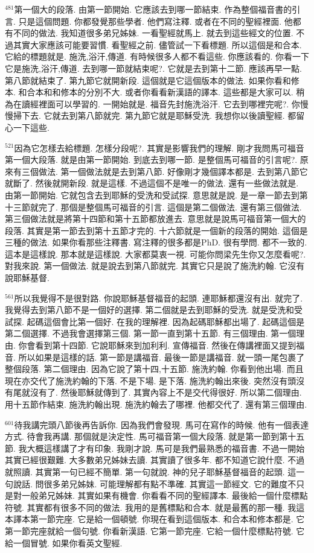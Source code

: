 \documentclass{book}
\begin{document}
$^{481}$第一個大的段落.
由第一節開始.
它應該去到哪一節結束.
作為整個福音書的引言.
只是這個問題.
你都發覺那些學者.
他們寫注釋.
或者在不同的聖經裡面.
他都有不同的做法.
我知道很多弟兄姊妹.
一看聖經就馬上.
就去到這些經文的位置.
不過其實大家應該可能要習慣.
看聖經之前.
儘管試一下看標題.
所以這個是和合本.
它給的標題就是.
施洗,浴汗,傳道.
有時候很多人都不看這些.
你應該看的.
你看一下它是施洗,浴汗,傳道.
去到哪一節就結束呢?.
它就是去到第十二節.
應該再早一點.
第八節就結束了.
第九節它就開新段.
這個就是它這個版本的做法.
如果你看和修本.
和合本和和修本的分別不大.
或者你看看新漢語的譯本.
這些都是大家可以.
稍為在讀經裡面可以學習的.
一開始就是.
福音先封施洗浴汗.
它去到哪裡完呢?.
你慢慢掃下去.
它就去到第八節就完.
第九節它就是耶穌受洗.
我想你以後讀聖經.
都留心一下這些.

$^{521}$因為它怎樣去給標題.
怎樣分段呢?.
其實是影響我們的理解.
剛才我問馬可福音第一個大段落.
就是由第一節開始.
到底去到哪一節.
是整個馬可福音的引言呢?.
原來有三個做法.
第一個做法就是去到第八節.
好像剛才幾個譯本都是.
去到第八節它就斷了.
然後就開新段.
就是這樣.
不過這個不是唯一的做法.
還有一些做法就是.
由第一節開始.
它就包含去到耶穌的受洗和受試探.
意思就是說.
是一章一節去到第十三節就完了.
那個是整個馬可福音的引言.
這個是第二個做法.
還有第三個做法.
第三個做法就是將第十四節和第十五節都放進去.
意思就是說馬可福音第一個大的段落.
其實是第一節去到第十五節才完的.
十六節就是一個新的段落的開始.
這個是三種的做法.
如果你看那些注釋書.
寫注釋的很多都是PhD.
很有學問.
都不一致的.
這本是這樣說.
那本就是這樣說.
大家都莫衷一視.
可能你問梁先生你又怎麼看呢?.
對我來說.
第一個做法.
就是說去到第八節就完.
其實它只是說了施洗約翰.
它沒有說耶穌基督.

$^{561}$所以我覺得不是很對路.
你說耶穌基督福音的起頭.
連耶穌都還沒有出.
就完了.
我覺得去到第八節不是一個好的選擇.
第二個就是去到耶穌的受洗.
就是受洗和受試探.
起碼這個會比第一個好.
在我的理解裡.
因為起碼耶穌都出場了.
起碼這個是第二個選擇.
不過我會選擇第三個.
第一節一直到第十五節.
有三個理由.
第一個理由.
你會看到第十四節.
它說耶穌來到加利利.
宣傳福音.
然後在傳講裡面又提到福音.
所以如果是這樣的話.
第一節是講福音.
最後一節是講福音.
就一頭一尾包裹了整個段落.
第二個理由.
因為它說了第十四,十五節.
施洗約翰.
你看到他出場.
而且現在亦交代了施洗約翰的下落.
不是下場.
是下落.
施洗約翰出來後.
突然沒有頭沒有尾就沒有了.
然後耶穌就傳到了.
其實內容上不是交代得很好.
所以第二個理由.
用十五節作結束.
施洗約翰出現.
施洗約翰去了哪裡.
他都交代了.
還有第三個理由.

$^{601}$待我講完頭八節後再告訴你.
因為我們會發現.
馬可在寫作的時候.
他有一個表達方式.
待會我再講.
那個就是決定性.
馬可福音第一個大段落.
就是第一節到第十五節.
我大概這樣講了才有印象.
我剛才說.
馬可是我們最熟悉的福音書.
不過一開始其實已經很艱難.
大多數弟兄姊妹去讀.
其實讀了很多年.
都不知道它說什麼.
不過就照讀.
其實第一句已經不簡單.
第一句就說.
神的兒子耶穌基督福音的起頭.
這一句說話.
問很多弟兄姊妹.
可能理解都有點不準確.
其實這一節經文.
它的難度不只是對一般弟兄姊妹.
其實如果有機會.
你看看不同的聖經譯本.
最後給一個什麼標點符號.
其實都有很多不同的做法.
我用的是舊標點和合本.
就是最舊的那一種.
我這本譯本第一節完座.
它是給一個頓號.
你現在看到這個版本.
和合本和修本都是.
它第一節完座就給一個句號.
你看新漢語.
它第一節完座.
它給一個什麼標點符號.
它給一個冒號.
如果你看英文聖經.
\end{document}
